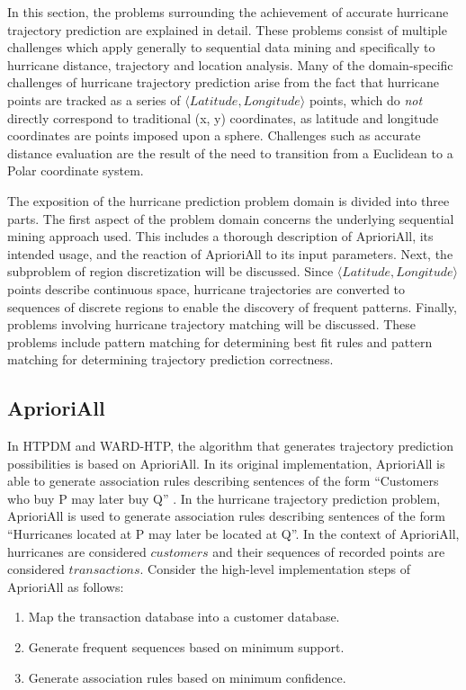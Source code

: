\documentclass[12pt,conference]{IEEEtran}
\begin{document}
In this section, the problems surrounding the achievement of accurate hurricane trajectory prediction are explained in detail. These problems consist of multiple challenges which apply generally to sequential data mining and specifically to hurricane distance, trajectory and location analysis. Many of the domain-specific challenges of hurricane trajectory prediction arise from the fact that hurricane points are tracked as a series of $\langle Latitude, Longitude \rangle$ points, which do \textit{not} directly correspond to traditional (x, y) coordinates, as latitude and longitude coordinates are points imposed upon a sphere. Challenges such as accurate distance evaluation are the result of the need to transition from a Euclidean to a Polar coordinate system.

The exposition of the hurricane prediction problem domain is divided into three parts. The first aspect of the problem domain concerns the underlying sequential mining approach used. This includes a thorough description of AprioriAll, its intended usage, and the reaction of AprioriAll to its input parameters. Next, the subproblem of region discretization will be discussed. Since $\langle Latitude, Longitude \rangle$ points describe continuous space, hurricane trajectories are converted to sequences of discrete regions to enable the discovery of frequent patterns. Finally, problems involving hurricane trajectory matching will be discussed. These problems include pattern matching for determining best fit rules and pattern matching for determining trajectory prediction correctness.

\subsection{AprioriAll}

In HTPDM and WARD-HTP, the algorithm that generates trajectory prediction possibilities is based on AprioriAll. In its original implementation, AprioriAll is able to generate association rules describing sentences of the form ``Customers who buy P may later buy Q'' \cite{AprioriAll-original}. In the hurricane trajectory prediction problem, AprioriAll is used to generate association rules describing sentences of the form ``Hurricanes located at P may later be located at Q''. In the context of AprioriAll, hurricanes are considered $customers$ and their sequences of recorded points are considered $transactions$. Consider the high-level implementation steps of AprioriAll as follows:

\begin{enumerate}
\item Map the transaction database into a customer database.
\item Generate frequent sequences based on minimum support.
\item Generate association rules based on minimum confidence.
\end{enumerate}
\end{document}
